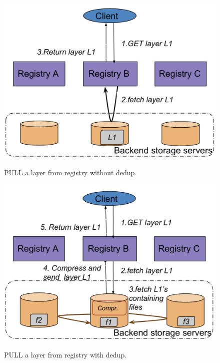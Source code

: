 \begin{figure}[t]
	\centering
		\begin{minipage}{0.225\textwidth}
			\centering
			\includegraphics[width=1\textwidth]{graphs/nodedup.png}
			\caption{PULL a layer from registry without dedup.}
			\label{fig:without-dedup}
		\end{minipage}
	\begin{minipage}{0.225\textwidth}
		\centering
		\includegraphics[width=1\textwidth]{graphs/dedup.png}
		\caption{PULL a layer from registry with dedup.}
		\vspace{-3pt}
		\label{fig:with-dedup}
	\end{minipage}
\end{figure}